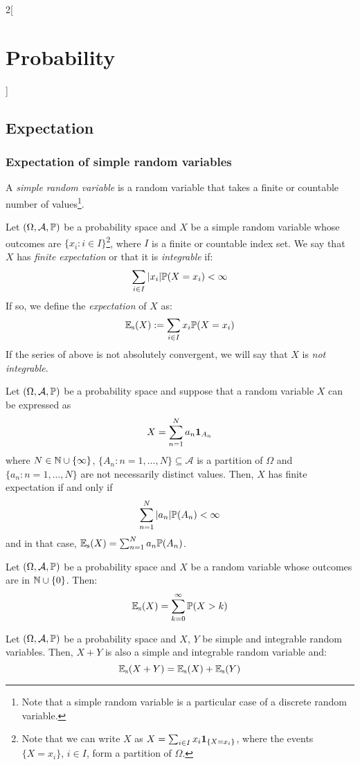\documentclass[../../../main.tex]{subfiles}
\begin{document}
\begin{multicols}{2}[\section{Probability}]
  \subsection{Expectation}\label{P_exp}
  \subsubsection{Expectation of simple random variables}
  \begin{definition}
    A \textit{simple random variable} is a random variable that takes a finite or countable number of values\footnote{Note that a simple random variable is a particular case of a discrete random variable.}.
  \end{definition}
  \begin{definition}
    Let $(\Omega,\mathcal{A},\mathbb{P})$ be a probability space and $X$ be a simple random variable whose outcomes are $\{x_i:i\in I\}$\footnote{Note that we can write $X$ as $X=\sum_{i\in I}x_i\boldsymbol{\mathrm{1}}_{\{X=x_i\}}$, where the events $\{X=x_i\}$, $i\in I$, form a partition of $\Omega$.}, where $I$ is a finite or countable index set. We say that $X$ has \textit{finite expectation} or that it is \textit{integrable} if: $$\sum_{i\in I}|x_i|\mathbb{P}(X=x_i)<\infty$$
    If so, we define the \textit{expectation} of $X$ as: $$\mathbb{E}_\text{s}(X):=\sum_{i\in I}x_i\mathbb{P}(X=x_i)$$ If the series of above is not absolutely convergent, we will say that $X$ is \textit{not integrable}.
  \end{definition}
  \begin{lemma}
    Let $(\Omega,\mathcal{A},\mathbb{P})$ be a probability space and suppose that a random variable $X$ can be expressed as $$X=\sum_{n=1}^Na_n\boldsymbol{\mathrm{1}}_{A_n}$$ where $N\in\mathbb{N}\cup\{\infty\}$, $\{A_n:n=1,\ldots,N\}\subseteq\mathcal{A}$ is a partition of $\Omega$ and $\{a_n:n=1,\ldots,N\}$ are not necessarily distinct values. Then, $X$ has finite expectation if and only if $$\sum_{n=1}^N|a_n|\mathbb{P}(A_n)<\infty$$ and in that case, $\mathbb{E}_\text{s}(X)=\sum_{n=1}^Na_n\mathbb{P}(A_n)$.
  \end{lemma}
  \begin{prop}
    Let $(\Omega,\mathcal{A},\mathbb{P})$ be a probability space and $X$ be a random variable whose outcomes are in $\mathbb{N}\cup\{0\}$. Then: $$\mathbb{E}_\text{s}(X)=\sum_{k=0}^\infty\mathbb{P}(X>k)$$
  \end{prop}
  \begin{prop}
    Let $(\Omega,\mathcal{A},\mathbb{P})$ be a probability space and $X$, $Y$ be simple and integrable random variables. Then, $X+Y$ is also a simple and integrable random variable and: $$\mathbb{E}_\text{s}(X+Y)=\mathbb{E}_\text{s}(X)+\mathbb{E}_\text{s}(Y)$$

\end{prop}
\end{multicols}
\end{document}
